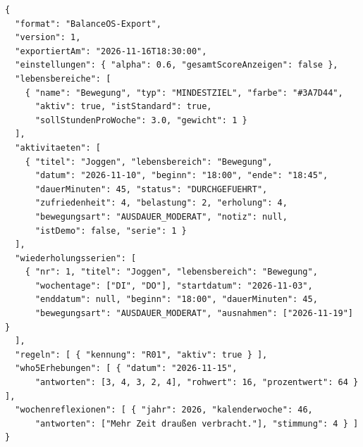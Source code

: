\begin{lstlisting}
{
  "format": "BalanceOS-Export",
  "version": 1,
  "exportiertAm": "2026-11-16T18:30:00",
  "einstellungen": { "alpha": 0.6, "gesamtScoreAnzeigen": false },
  "lebensbereiche": [
    { "name": "Bewegung", "typ": "MINDESTZIEL", "farbe": "#3A7D44",
      "aktiv": true, "istStandard": true,
      "sollStundenProWoche": 3.0, "gewicht": 1 }
  ],
  "aktivitaeten": [
    { "titel": "Joggen", "lebensbereich": "Bewegung",
      "datum": "2026-11-10", "beginn": "18:00", "ende": "18:45",
      "dauerMinuten": 45, "status": "DURCHGEFUEHRT",
      "zufriedenheit": 4, "belastung": 2, "erholung": 4,
      "bewegungsart": "AUSDAUER_MODERAT", "notiz": null,
      "istDemo": false, "serie": 1 }
  ],
  "wiederholungsserien": [
    { "nr": 1, "titel": "Joggen", "lebensbereich": "Bewegung",
      "wochentage": ["DI", "DO"], "startdatum": "2026-11-03",
      "enddatum": null, "beginn": "18:00", "dauerMinuten": 45,
      "bewegungsart": "AUSDAUER_MODERAT", "ausnahmen": ["2026-11-19"] }
  ],
  "regeln": [ { "kennung": "R01", "aktiv": true } ],
  "who5Erhebungen": [ { "datum": "2026-11-15",
      "antworten": [3, 4, 3, 2, 4], "rohwert": 16, "prozentwert": 64 } ],
  "wochenreflexionen": [ { "jahr": 2026, "kalenderwoche": 46,
      "antworten": ["Mehr Zeit draußen verbracht."], "stimmung": 4 } ]
}
\end{lstlisting}
